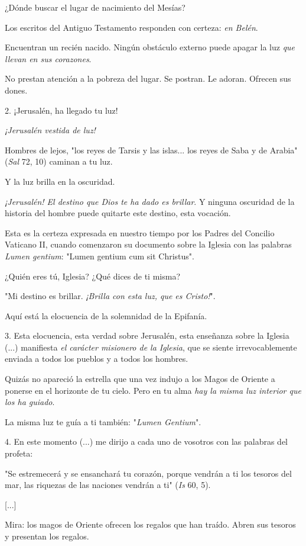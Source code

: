 \begin{body}
¿Dónde buscar el lugar de nacimiento del Mesías?

Los escritos del Antiguo Testamento responden con certeza: \emph{en Belén}.

Encuentran un recién nacido. Ningún obstáculo externo puede apagar la luz \emph{que llevan en sus corazones}.

No prestan atención a la pobreza del lugar. Se postran. Le adoran. Ofrecen sus dones.

2. ¡Jerusalén, ha llegado tu luz!

\emph{¡Jerusalén vestida de luz!}

Hombres de lejos, "los reyes de Tarsis y las islas... los reyes de Saba y de Arabia" (\emph{Sal} 72, 10) caminan a tu luz.

Y la luz brilla en la oscuridad.

\emph{¡Jerusalén! El destino que Dios te ha dado es brillar}. Y ninguna oscuridad de la historia del hombre puede quitarte este destino, esta vocación.

Esta es la certeza expresada en nuestro tiempo por los Padres del Concilio Vaticano II, cuando comenzaron su documento sobre la Iglesia con las palabras \emph{Lumen gentium}: "Lumen gentium cum sit Christus".

¿Quién eres tú, Iglesia? ¿Qué dices de ti misma?

"Mi destino es brillar. \emph{¡Brilla con esta luz, que es Cristo!}".

Aquí está la elocuencia de la solemnidad de la Epifanía.

3. Esta elocuencia, esta verdad sobre Jerusalén, esta enseñanza sobre la Iglesia (...) manifiesta \emph{el carácter misionero de la Iglesia}, que se siente irrevocablemente enviada a todos los pueblos y a todos los hombres.

Quizás no apareció la estrella que una vez indujo a los Magos de Oriente a ponerse en el horizonte de tu cielo. Pero en tu alma \emph{hay la misma luz interior que los ha guiado}.

La misma luz te guía a ti también: "\emph{Lumen Gentium}".

4. En este momento (...) me dirijo a cada uno de vosotros con las palabras del profeta:

"Se estremecerá y se ensanchará tu corazón, porque vendrán a ti los tesoros del mar, las riquezas de las naciones vendrán a ti" (\emph{Is} 60, 5).

{[}...{]}

Mira: los magos de Oriente ofrecen los regalos que han traído. Abren sus tesoros y presentan los regalos.


\end{body}

